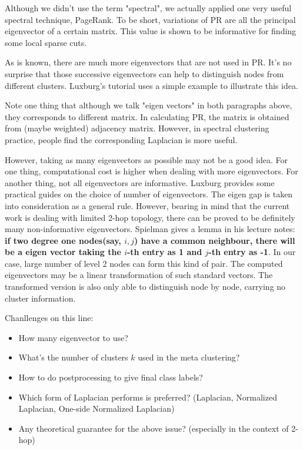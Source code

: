 \documentclass[11pt,a4paper]{article}
\begin{document}
Although we didn't use the term "spectral", we actually applied 
one very useful spectral technique, PageRank. To be short, variations 
of PR are all the principal eigenvector of a certain matrix. 
This value is shown to be informative for finding some local 
sparse cuts\cite{csci5160course}. 

As is known, there are much more eigenvectors that are not used in PR. 
It's no surprise that those successive eigenvectors can help to 
distinguish nodes from different clusters. Luxburg's tutorial\cite{von2007tutorial}
uses a simple example to illustrate this idea. 

Note one thing that although we talk "eigen vectors" in both paragraphs above, 
they corresponds to different matrix. In calculating PR, the matrix 
is obtained from (maybe weighted) adjacency matrix. However, in spectral 
clustering practice, people find the corresponding Laplacian is more useful. 

However, taking as many eigenvectors as possible may not be a good
idea. For one thing, computational cost is higher when dealing with 
more eigenvectors. For another thing, not all eigenvectors are informative. 
Luxburg\cite{von2007tutorial} provides some practical guides on the choice 
of number of eigenvectors. The eigen gap is taken into consideration as a 
general rule. However, bearing in mind that the current work is dealing 
with limited 2-hop topology, there can be proved to be definitely many 
non-informative eigenvectors. Spielman
gives a lemma in his lecture notes\cite{spielman-2009spectral-ln}:
\textbf{if two degree one nodes(say, $i,j$) have a common neighbour, there will 
be a eigen vector taking the $i$-th entry as 1 and $j$-th entry as -1}. 
In our case, large number of level 2 nodes can form this kind of pair. 
The computed eigenvectors may be a linear transformation of such 
standard vectors. The transformed version is also only able to distinguish 
node by node, carrying no cluster information. 

Chanllenges on this line:
\begin{itemize}
	\item How many eigenvector to use? 
	\item What's the number of clusters $k$ used in the 
	meta clustering? 
	\item How to do postprocessing to give final class labels? 
	\item Which form of Laplacian performs is preferred? 
	(Laplacian, Normalized Laplacian, One-side Normalized Laplacian)
	\item Any theoretical guarantee for the above issue? 
	(especially in the context of 2-hop)
\end{itemize}
\end{document}

